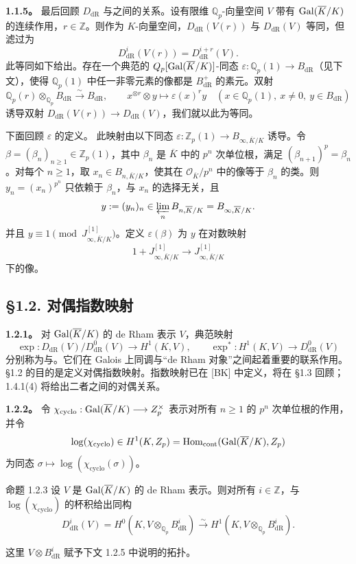 \textbf{1.1.5。} 最后回顾 $D_{\mathrm{dR}}$ 与之间的关系。设有限维 $\mathbb Q_p$-向量空间 $V$ 带有 $\operatorname{Gal}(\overline K/K)$ 的连续作用，$r\in\mathbb Z$。则作为 $K$-向量空间，$D_{\mathrm{dR}}(V(r))$ 与 $D_{\mathrm{dR}}(V)$ 等同，但滤过为
\[
 D^i_{\mathrm{dR}}(V(r))=D^{i+r}_{\mathrm{dR}}(V).
\]
此等同如下给出。存在一个典范的 $Q_p[\operatorname{Gal}(\overline K/K)]$-同态
$\varepsilon:\mathbb Q_p(1)\longrightarrow B_{\mathrm{dR}}$（见下文），使得 $\mathbb Q_p(1)$ 中任一非零元素的像都是 $B^+_{\mathrm{dR}}$ 的素元。双射
\[
 \mathbb Q_p(r)\otimes_{\mathbb Q_p}B_{\mathrm{dR}}\xrightarrow{\sim}B_{\mathrm{dR}},\qquad
 x^{\otimes r}\otimes y\longmapsto\varepsilon(x)^r y
 \quad(x\in\mathbb Q_p(1),\ x\ne0,\ y\in B_{\mathrm{dR}})
\]
诱导双射 $D_{\mathrm{dR}}(V(r))\longrightarrow D_{\mathrm{dR}}(V)$，我们就以此为等同。

下面回顾 $\varepsilon$ 的定义。
此映射由以下同态 $\varepsilon:\mathbb Z_p(1)\longrightarrow B_{\infty,\overline K/K}$ 诱导。令 $\beta=(\beta_n)_{n\ge1}\in\mathbb Z_p(1)$，其中 $\beta_n$ 是 $\overline K$ 中的 $p^n$ 次单位根，满足 $(\beta_{n+1})^p=\beta_n$。对每个 $n\ge1$，取 $x_n\in B_{n,\overline K/K}$，使其在 $\mathcal O_{\overline K}/p^n$ 中的像等于 $\beta_n$ 的类。则 $y_n=(x_n)^{p^n}$ 只依赖于 $\beta_n$，与 $x_n$ 的选择无关，且
\[
 y:=(y_n)_n\in\varprojlim_n B_{n,\overline K/K}=B_{\infty,\overline K/K}.
\]
并且 $y\equiv1\pmod{J^{[1]}_{\infty,\overline K/K}}$。定义 $\varepsilon(\beta)$ 为 $y$ 在对数映射
\[
 1+J^{[1]}_{\infty,\overline K/K}\longrightarrow J^{[1]}_{\infty,\overline K/K}
\]
下的像。

\subsection*{§1.2. 对偶指数映射}
\textbf{1.2.1。} 对 $\operatorname{Gal}(\overline K/K)$ 的 de Rham 表示 $V$，典范映射
\[
 \exp:D_{\mathrm{dR}}(V)/D^0_{\mathrm{dR}}(V)\longrightarrow H^1(K,V),\qquad
 \exp^*:H^1(K,V)\longrightarrow D^0_{\mathrm{dR}}(V)
\]
分别称为与。它们在 Galois 上同调与“de Rham 对象”之间起着重要的联系作用。§1.2 的目的是定义对偶指数映射。指数映射已在 [BK] 中定义，将在 §1.3 回顾；1.4.1(4) 将给出二者之间的对偶关系。

\textbf{1.2.2。} 令 $\chi_{\mathrm{cyclo}}:\operatorname{Gal}(\overline K/K)\longrightarrow Z_p^\times$ 表示对所有 $n\ge1$ 的 $p^n$ 次单位根的作用，并令
\[
 \log(\chi_{\mathrm{cyclo}})\in H^1(K,Z_p)=\operatorname{Hom}_{\mathrm{cont}}(\operatorname{Gal}(\overline K/K),Z_p)
\]
为同态 $\sigma\mapsto\log(\chi_{\mathrm{cyclo}}(\sigma))$。
\begin{statement}{命题 1.2.3}
设 $V$ 是 $\operatorname{Gal}(\overline K/K)$ 的 de Rham 表示。则对所有 $i\in\mathbb Z$，与 $\log(\chi_{\mathrm{cyclo}})$ 的杯积给出同构
\[
 D^i_{\mathrm{dR}}(V)=H^0(K,V\otimes_{\mathbb Q_p}B^i_{\mathrm{dR}})\xrightarrow{\sim}H^1(K,V\otimes_{\mathbb Q_p}B^i_{\mathrm{dR}}).
\]
\end{statement}
这里 $V\otimes B^i_{\mathrm{dR}}$ 赋予下文 1.2.5 中说明的拓扑。

